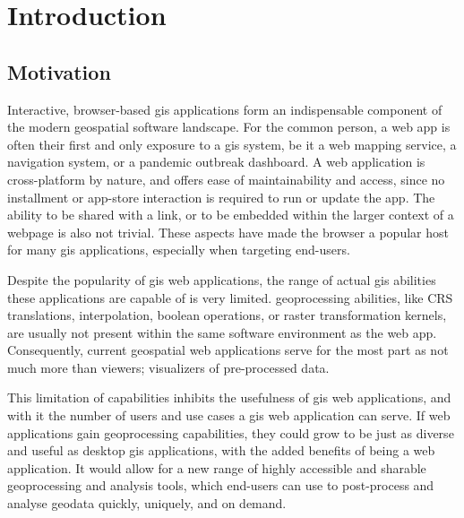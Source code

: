 
\newpage
\section{Introduction}

\subsection{Motivation}

Interactive, browser-based \ac{gis} applications form an indispensable component of the modern geospatial software landscape. For the common person, a web app is often their first and only exposure to a \ac{gis} system, be it a web mapping service, a navigation system, or a pandemic outbreak dashboard. A web application is cross-platform by nature, and offers ease of maintainability and access, since no installment or app-store interaction is required to run or update the app. The ability to be shared with a link, or to be embedded within the larger context of a webpage is also not trivial. These aspects have made the browser a popular host for many \ac{gis} applications, especially when targeting end-users. 

Despite the popularity of \ac{gis} web applications, the range of actual \ac{gis} abilities these applications are capable of is very limited. \ac{geoprocessing} abilities, like CRS translations, interpolation, boolean operations, or raster transformation kernels, are usually not present within the same software environment as the web app. Consequently, current geospatial web applications serve for the most part as not much more than viewers; visualizers of pre-processed data. 

This limitation of capabilities inhibits the usefulness of \ac{gis} web applications, and with it the number of users and use cases a \ac{gis} web application can serve. If web applications gain \ac{geoprocessing} capabilities, they could grow to be just as diverse and useful as desktop \ac{gis} applications, with the added benefits of being a web application. It would allow for a new range of highly accessible and sharable geoprocessing and analysis tools, which end-users can use to post-process and analyse geodata quickly, uniquely, and on demand.

